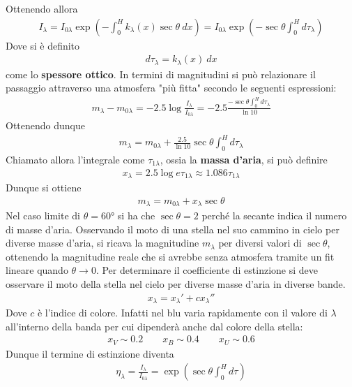 \documentclass[a4paper, oneside]{book}
\begin{document}
Ottenendo allora 
\begin{gather*}
    I_\lambda = I_{0\lambda}\exp\left(- \int_{0}^{H}k_\lambda (x) \sec \theta \ dx\right) = I_{0\lambda}\exp\left(-\sec\theta \int_{0}^{H} d\tau_\lambda \right)
\end{gather*}
Dove si è definito
\begin{gather*}
    d\tau_\lambda = k_\lambda(x) \ dx 
\end{gather*}
come lo \textbf{spessore ottico}. In termini di magnitudini si può relazionare il passaggio attraverso una
atmosfera "più fitta" secondo le seguenti espressioni:
\begin{gather*}
    m_\lambda - m_{0\lambda} = -2.5\log \frac{I_\lambda}{I_{0\lambda}} = -2.5 \frac{\displaystyle -\sec\theta \int_{0}^{H}d\tau_\lambda }{\ln 10}
\end{gather*}
Ottenendo dunque 
\begin{align}
    m_\lambda = m_{0\lambda} + \frac{2.5}{\ln 10} \sec\theta \int_{0}^{H}d\tau_\lambda 
\end{align}
Chiamato allora l'integrale come $\tau_{1\lambda}$, ossia la \textbf{massa d'aria}, si può definire
\begin{gather*}
    x_\lambda = 2.5 \log e \tau_{1\lambda} \approx 1.086 \tau_{1\lambda}
\end{gather*}
Dunque si ottiene 
\begin{align}
    m_\lambda = m_{0\lambda} + x_\lambda \sec \theta
\end{align}
Nel caso limite di $\theta = 60$° si ha che $\sec \theta = 2$ perché la secante indica il numero di masse d'aria.
Osservando il moto di una stella nel suo cammino in cielo per
diverse masse d'aria, si ricava la magnitudine $m_\lambda$ per diversi 
valori di $\sec\theta$, ottenendo la magnitudine reale che si 
avrebbe senza atmosfera tramite un fit lineare quando $\theta \to 0$. 
Per determinare il coefficiente di estinzione si deve osservare il moto della stella
nel cielo per diverse masse d'aria in diverse bande.
\begin{gather*}
    x_\lambda = x_\lambda ' + c x_\lambda ''
\end{gather*} 
Dove $c$ è l'indice di colore. Infatti nel blu varia rapidamente 
con il valore di $\lambda$ all'interno della banda per cui dipenderà anche
dal colore della stella:
\begin{gather*}
    x_V \sim 0.2 \qquad x_B \sim 0.4 \qquad x_U \sim 0.6
\end{gather*}
Dunque il termine di estinzione diventa
\begin{align}
    \eta_\lambda = \frac{I_\lambda}{I_{0\lambda}} = \exp\left(\sec\theta \int_{0}^{H} d\tau \right)
\end{align}
\end{document}
